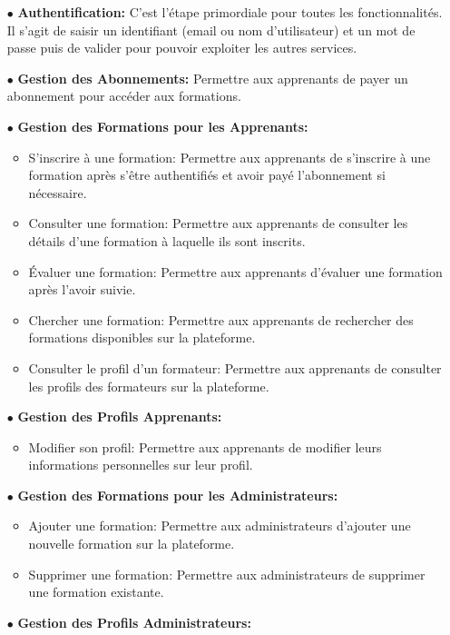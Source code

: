 \begin{itemize}
    \item[$\bullet$] \textbf{Authentification:} C’est l’étape primordiale pour toutes les fonctionnalités. Il s’agit de saisir un identifiant (email ou nom d'utilisateur) et un mot de passe puis de valider pour pouvoir exploiter les autres services.
    \item[$\bullet$] \textbf{Gestion des Abonnements:} Permettre aux apprenants de payer un abonnement pour accéder aux formations.
    \item[$\bullet$] \textbf{Gestion des Formations pour les Apprenants:}
    \begin{itemize}
        \item  S'inscrire à une formation: Permettre aux apprenants de s'inscrire à une formation après s'être authentifiés et avoir payé l'abonnement si nécessaire.
        \item  Consulter une formation: Permettre aux apprenants de consulter les détails d'une formation à laquelle ils sont inscrits.
        \item  Évaluer une formation: Permettre aux apprenants d'évaluer une formation après l'avoir suivie.
        \item  Chercher une formation: Permettre aux apprenants de rechercher des formations disponibles sur la plateforme.
        \item  Consulter le profil d'un formateur: Permettre aux apprenants de consulter les profils des formateurs sur la plateforme.
    \end{itemize}
    \item[$\bullet$] \textbf{Gestion des Profils Apprenants:}
    \begin{itemize}
        \item  Modifier son profil: Permettre aux apprenants de modifier leurs informations personnelles sur leur profil.
    \end{itemize}
    \item[$\bullet$] \textbf{Gestion des Formations pour les Administrateurs:}
    \begin{itemize}
        \item  Ajouter une formation: Permettre aux administrateurs d'ajouter une nouvelle formation sur la plateforme.
        \item  Supprimer une formation: Permettre aux administrateurs de supprimer une formation existante.
    \end{itemize}
    \item[$\bullet$] \textbf{Gestion des Profils Administrateurs:}

\end{itemize}
